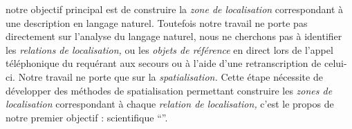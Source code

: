 notre objectif principal est de construire la
\emph{zone de localisation} correspondant à une description en langage
naturel. Toutefois notre travail ne porte pas directement sur
l'analyse du langage naturel, nous ne cherchons pas à identifier les
\emph{relations de localisation,} ou les \emph{objets de référence} en
direct lors de l'appel téléphonique du requérant aux secours ou à
l'aide d'une retranscription de celui-ci. Notre travail ne porte que
sur la \emph{spatialisation.} Cette étape nécessite de développer des
méthodes de spatialisation permettant construire les \emph{zones de
  localisation} correspondant à chaque \emph{relation de
  localisation,} c'est le propos de notre premier objectif :
scientifique \enquote{}.





